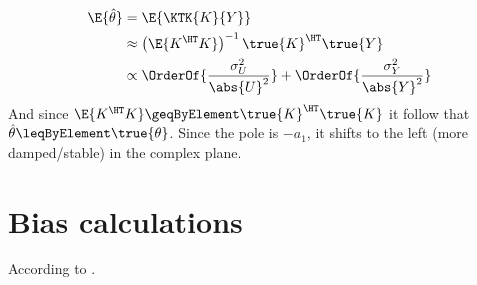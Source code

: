 \begin{align}
  \E{\hat{\theta}} &= \E{\KTK{K}{Y}} \\
                   &\approx 
                      \left(\E{K^{\HT}K}\right)^{-1} \true{K}^{\HT} \true{Y} \\
                   &\propto
                   \OrderOf{\frac{\sigma_U^2}{\abs{U}^2}} + \OrderOf{\frac{\sigma_Y^2}{\abs{Y}^2}}
\end{align}
And since $\E{K^{\HT}K} \geqByElement \true{K}^{\HT}\true{K}$ it follow that $\hat{\theta} \leqByElement \true{\theta}$.
Since the pole is $-a_1$, it shifts to the left (more damped/stable) in the complex plane.

\section{Bias calculations}
According to \cite[Appendix A]{Guillaume1995}.

